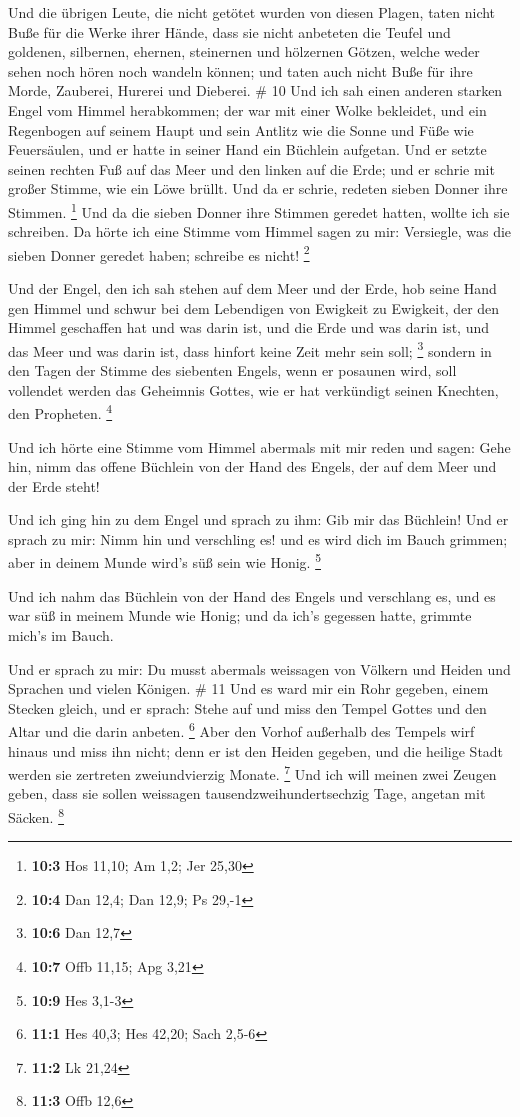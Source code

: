  Und die übrigen Leute, die nicht getötet wurden von diesen
Plagen, taten nicht Buße für die Werke ihrer Hände, dass sie nicht
anbeteten die Teufel und goldenen, silbernen, ehernen, steinernen und
hölzernen Götzen, welche weder sehen noch hören noch wandeln können;
 und taten auch nicht Buße für ihre Morde, Zauberei,
Hurerei und Dieberei. \# 10  Und ich sah einen anderen
starken Engel vom Himmel herabkommen; der war mit einer Wolke bekleidet,
und ein Regenbogen auf seinem Haupt und sein Antlitz wie die Sonne und
Füße wie Feuersäulen,  und er hatte in seiner Hand ein
Büchlein aufgetan. Und er setzte seinen rechten Fuß auf das Meer und den
linken auf die Erde;  und er schrie mit großer Stimme, wie
ein Löwe brüllt. Und da er schrie, redeten sieben Donner ihre Stimmen.
\footnote{\textbf{10:3} Hos 11,10; Am 1,2; Jer 25,30}  Und
da die sieben Donner ihre Stimmen geredet hatten, wollte ich sie
schreiben. Da hörte ich eine Stimme vom Himmel sagen zu mir: Versiegle,
was die sieben Donner geredet haben; schreibe es nicht! \footnote{\textbf{10:4}
  Dan 12,4; Dan 12,9; Ps 29,-1}

 Und der Engel, den ich sah stehen auf dem Meer und der
Erde, hob seine Hand gen Himmel  und schwur bei dem
Lebendigen von Ewigkeit zu Ewigkeit, der den Himmel geschaffen hat und
was darin ist, und die Erde und was darin ist, und das Meer und was
darin ist, dass hinfort keine Zeit mehr sein soll; \footnote{\textbf{10:6}
  Dan 12,7}  sondern in den Tagen der Stimme des siebenten
Engels, wenn er posaunen wird, soll vollendet werden das Geheimnis
Gottes, wie er hat verkündigt seinen Knechten, den Propheten.
\footnote{\textbf{10:7} Offb 11,15; Apg 3,21}

 Und ich hörte eine Stimme vom Himmel abermals mit mir reden
und sagen: Gehe hin, nimm das offene Büchlein von der Hand des Engels,
der auf dem Meer und der Erde steht!

 Und ich ging hin zu dem Engel und sprach zu ihm: Gib mir
das Büchlein! Und er sprach zu mir: Nimm hin und verschling es! und es
wird dich im Bauch grimmen; aber in deinem Munde wird's süß sein wie
Honig. \footnote{\textbf{10:9} Hes 3,1-3}

 Und ich nahm das Büchlein von der Hand des Engels und
verschlang es, und es war süß in meinem Munde wie Honig; und da ich's
gegessen hatte, grimmte mich's im Bauch.

 Und er sprach zu mir: Du musst abermals weissagen von
Völkern und Heiden und Sprachen und vielen Königen. \# 11 
Und es ward mir ein Rohr gegeben, einem Stecken gleich, und er sprach:
Stehe auf und miss den Tempel Gottes und den Altar und die darin
anbeten. \footnote{\textbf{11:1} Hes 40,3; Hes 42,20; Sach 2,5-6}
 Aber den Vorhof außerhalb des Tempels wirf hinaus und miss
ihn nicht; denn er ist den Heiden gegeben, und die heilige Stadt werden
sie zertreten zweiundvierzig Monate. \footnote{\textbf{11:2} Lk 21,24}
 Und ich will meinen zwei Zeugen geben, dass sie sollen
weissagen tausendzweihundertsechzig Tage, angetan mit Säcken.
\footnote{\textbf{11:3} Offb 12,6}

